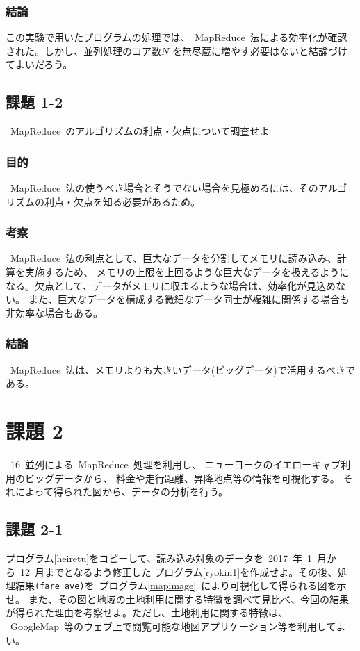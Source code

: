 \documentclass[10pt]{jarticle}
\begin{document}
\newpage

%

\subsubsection{結論}
%
この実験で用いたプログラムの処理では、\ MapReduce\ 法による効率化が確認された。しかし、並列処理のコア数$ N $
を無尽蔵に増やす必要はないと結論づけてよいだろう。
%

\subsection{課題 1-2}
%
\ MapReduce\ のアルゴリズムの利点・欠点について調査せよ
%

\subsubsection{目的}
%
\ MapReduce\ 法の使うべき場合とそうでない場合を見極めるには、そのアルゴリズムの利点・欠点を知る必要があるため。
%

\subsubsection{考察}
%
\ MapReduce\ 法の利点として、巨大なデータを分割してメモリに読み込み、計算を実施するため、
メモリの上限を上回るような巨大なデータを扱えるようになる。欠点として、データがメモリに収まるような場合は、効率化が見込めない。
また、巨大なデータを構成する微細なデータ同士が複雑に関係する場合も非効率な場合もある。
%

\subsubsection{結論}
%
\ MapReduce\ 法は、メモリよりも大きいデータ(ビッグデータ)で活用するべきである。
%

\section{課題 2}
%
\ 16\ 並列による\ MapReduce\ 処理を利用し、
ニューヨークのイエローキャブ利用のビッグデータから、
料金や走行距離、昇降地点等の情報を可視化する。
それによって得られた図から、データの分析を行う。

%

\subsection{課題 2-1}
%
プログラム\ref{heiretu}をコピーして、読み込み対象のデータを\ 2017\ 年\ 1\ 月から\ 12\ 月までとなるよう修正した
プログラム\ref{ryokin1}を作成せよ。その後、処理結果\verb|(fare_ave)|を\ プログラム\ref{mapimage}\ により可視化して得られる図を示せ。
また、その図と地域の土地利用に関する特徴を調べて見比べ、今回の結果が得られた理由を考察せよ。ただし、土地利用に関する特徴は、
\ GoogleMap\ 等のウェブ上で閲覧可能な地図アプリケーション等を利用してよい。

%
\end{document}
